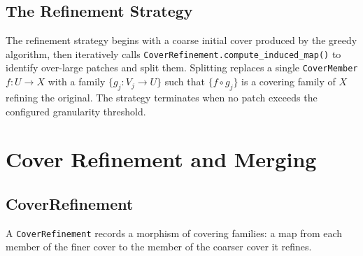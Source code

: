 \documentclass[11pt]{article}
\begin{document}
\subsection{The Refinement Strategy}

The refinement strategy begins with a coarse initial cover produced
by the greedy algorithm, then iteratively calls
\texttt{CoverRefinement.compute\_induced\_map()} to identify
over-large patches and split them.
Splitting replaces a single \texttt{CoverMember}
$f : U \to X$ with a family $\{g_j : V_j \to U\}$ such that
$\{f \circ g_j\}$ is a covering family of $X$ refining the original.
The strategy terminates when no patch exceeds the configured
granularity threshold.

\section{Cover Refinement and Merging}\label{sec:refinement}

\subsection{CoverRefinement}

A \texttt{CoverRefinement} records a morphism of covering families: a
map from each member of the finer cover to the member of the coarser
cover it refines.
\end{document}
